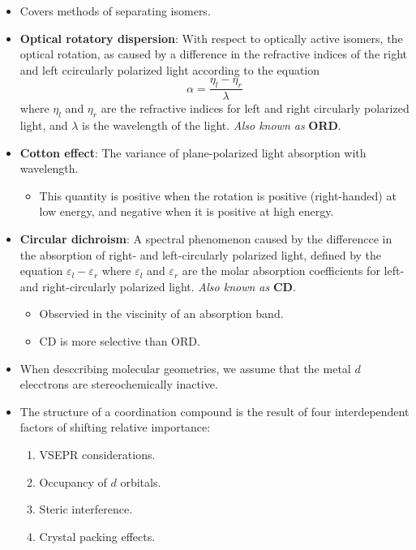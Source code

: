 \documentclass[../notes.tex]{subfiles}
\begin{document}
\begin{itemize}
    \item Covers methods of separating isomers.
    \item \textbf{Optical rotatory dispersion}: With respect to optically active isomers, the optical rotation, as caused by a difference in the refractive indices of the right and left ccircularly polarized light according to the equation
    \begin{equation*}
        \alpha = \frac{\eta_l-\eta_r}{\lambda}
    \end{equation*}
    where $\eta_l$ and $\eta_r$ are the refractive indices for left and right circularly polarized light, and $\lambda$ is the wavelength of the light. \emph{Also known as} \textbf{ORD}.
    \item \textbf{Cotton effect}: The variance of plane-polarized light absorption with wavelength.
    \begin{itemize}
        \item This quantity is positive when the rotation is positive (right-handed) at low energy, and negative when it is positive at high energy.
    \end{itemize}
    \item \textbf{Circular dichroism}: A spectral phenomenon caused by the differencce in the absorption of right- and left-circularly polarized light, defined by the equation $\varepsilon_l-\varepsilon_r$ where $\varepsilon_l$ and $\varepsilon_r$ are the molar absorption coefficients for left- and right-circularly polarized light. \emph{Also known as} \textbf{CD}.
    \begin{itemize}
        \item Observied in the viscinity of an absorption band.
        \item CD is more selective than ORD.
    \end{itemize}
    \item When desccribing molecular geometries, we assume that the metal $d$ elecctrons are stereochemically inactive.
    \item The structure of a coordination compound is the result of four interdependent factors of shifting relative importance:
    \begin{enumerate}
        \item VSEPR considerations.
        \item Occupancy of $d$ orbitals.
        \item Steric interference.
        \item Crystal packing effects.
        \begin{itemize}[label={\scriptsize$\blacksquare$}]

\end{itemize}
\end{enumerate}
\end{itemize}
\end{document}
